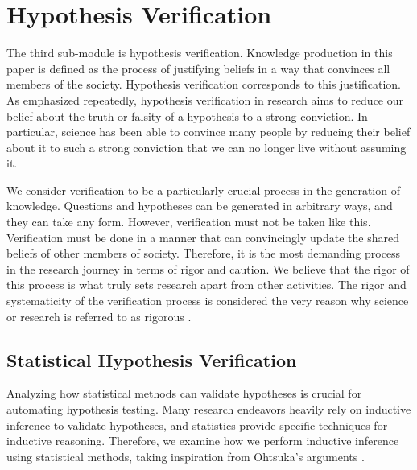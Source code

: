 

\section{Hypothesis Verification}
The third sub-module is hypothesis verification. Knowledge production in this paper is defined as the process of justifying beliefs in a way that convinces all members of the society. Hypothesis verification corresponds to this justification. As emphasized repeatedly, hypothesis verification in research aims to reduce our belief about the truth or falsity of a hypothesis to a strong conviction. In particular, science has been able to convince many people by reducing their belief about it to such a strong conviction that we can no longer live without assuming it.

We consider verification to be a particularly crucial process in the generation of knowledge. Questions and hypotheses can be generated in arbitrary ways, and they can take any form. However, verification must not be taken like this. Verification must be done in a manner that can convincingly update the shared beliefs of other members of society. Therefore, it is the most demanding process in the research journey in terms of rigor and caution. We believe that the rigor of this process is what truly sets research apart from other activities. The rigor and systematicity of the verification process is considered the very reason why science or research is referred to as rigorous \cite{sep-scientific-method,hoyningen2008systematicity,haack2003defending}.

\subsection{Statistical Hypothesis Verification}
Analyzing how statistical methods can validate hypotheses is crucial for automating hypothesis testing. Many research endeavors heavily rely on inductive inference to validate hypotheses, and statistics provide specific techniques for inductive reasoning. Therefore, we examine how we perform inductive inference using statistical methods, taking inspiration from Ohtsuka's arguments \cite{otsuka2022thinking}.

